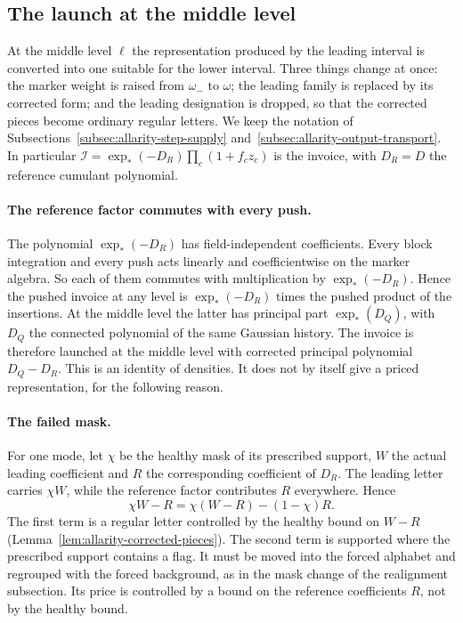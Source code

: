 \subsection{The launch at the middle level}
\label{subsec:allarity-corrected-budget}

At the middle level $\ell$ the representation produced by the leading
interval is converted into one suitable for the lower interval. Three
things change at once: the marker weight is raised from $\omega_-$ to
$\omega$; the leading family is replaced by its corrected form; and the
leading designation is dropped, so that the corrected pieces become
ordinary regular letters. We keep the notation of
Subsections~\ref{subsec:allarity-step-supply}
and~\ref{subsec:allarity-output-transport}. In particular
$\mathcal I=\exp_*(-D_R)\prod_c(1+f_cz_c)$ is the invoice, with $D_R=D$ the
reference cumulant polynomial.

\paragraph{The reference factor commutes with every push.}
The polynomial $\exp_*(-D_R)$ has field-independent coefficients. Every
block integration and every push acts linearly and coefficientwise on
the marker algebra. So each of them commutes with multiplication by
$\exp_*(-D_R)$. Hence the pushed invoice at any level is
$\exp_*(-D_R)$ times the pushed product of the insertions. At the middle
level the latter has principal part $\exp_*(D_Q)$, with $D_Q$ the
connected polynomial of the same Gaussian history. The invoice is
therefore launched at the middle level with corrected principal
polynomial $D_Q-D_R$. This is an identity of densities. It does not by
itself give a priced representation, for the following reason.

\paragraph{The failed mask.}
For one mode, let $\chi$ be the healthy mask of its prescribed support,
$W$ the actual leading coefficient and $R$ the corresponding coefficient
of $D_R$. The leading letter carries $\chi W$, while the reference factor
contributes $R$ everywhere. Hence
\[
 \chi W-R=\chi(W-R)-(1-\chi)R .
\]
The first term is a regular letter controlled by the healthy bound on
$W-R$ (Lemma~\ref{lem:allarity-corrected-pieces}). The second term is
supported where the prescribed support contains a flag. It must be moved
into the forced alphabet and regrouped with the forced background, as in
the mask change of the realignment subsection. Its price is controlled by
a bound on the reference coefficients $R$, not by the healthy bound.

